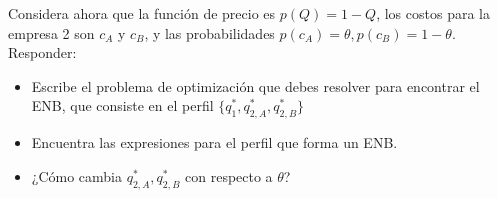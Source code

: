 \documentclass[12pt]{scrartcl} %
\begin{document}
\begin{Exercise}[name=Pregunta]

  Considera ahora que la función de precio es $ p(Q) = 1 - Q $, los costos para la empresa 2 son $ c_A $ y $ c_B $, y las probabilidades $ p(c_A) = \theta, p(c_B) = 1-\theta $.
  Responder:

 \begin{itemize}
   \setlength{\itemsep}{0pt}
   \setlength{\parskip}{0pt}
   \setlength{\parsep}{0pt}
   \item Escribe el problema de optimización que debes resolver para encontrar el ENB, que consiste en el perfil $\{q_1^*, q_{2,A}^*, q_{2,B}^* \}$
   \item Encuentra las expresiones para el perfil que forma un ENB.
   \item ¿Cómo cambia $ q_{2,A}^*, q_{2,B}^*  $ con respecto a $ \theta $?
 \end{itemize}
  
\end{Exercise}
\end{document}
